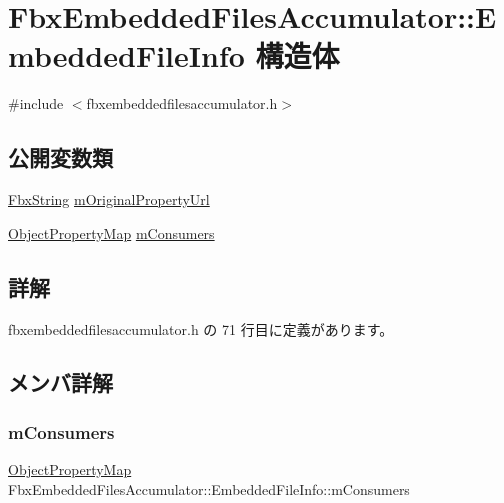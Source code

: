 \hypertarget{struct_fbx_embedded_files_accumulator_1_1_embedded_file_info}{}\section{Fbx\+Embedded\+Files\+Accumulator\+:\+:Embedded\+File\+Info 構造体}
\label{struct_fbx_embedded_files_accumulator_1_1_embedded_file_info}


{\ttfamily \#include $<$fbxembeddedfilesaccumulator.\+h$>$}

\subsection*{公開変数類}
\begin{DoxyCompactItemize}
\item 
\hyperlink{class_fbx_string}{Fbx\+String} \hyperlink{struct_fbx_embedded_files_accumulator_1_1_embedded_file_info_a3a7df7013bc1f2a90a3d1b9cad7b52e1}{m\+Original\+Property\+Url}
\item 
\hyperlink{class_fbx_embedded_files_accumulator_abc919e5ba3486530790dcd7ef90b8eed}{Object\+Property\+Map} \hyperlink{struct_fbx_embedded_files_accumulator_1_1_embedded_file_info_a04b3e7c42f3fe61536e8cc3a13ad682f}{m\+Consumers}
\end{DoxyCompactItemize}


\subsection{詳解}


 fbxembeddedfilesaccumulator.\+h の 71 行目に定義があります。



\subsection{メンバ詳解}
\mbox{\label{struct_fbx_embedded_files_accumulator_1_1_embedded_file_info_a04b3e7c42f3fe61536e8cc3a13ad682f}} 
\subsubsection{\texorpdfstring{m\+Consumers}{mConsumers}}
{\footnotesize\ttfamily \hyperlink{class_fbx_embedded_files_accumulator_abc919e5ba3486530790dcd7ef90b8eed}{Object\+Property\+Map} Fbx\+Embedded\+Files\+Accumulator\+::\+Embedded\+File\+Info\+::m\+Consumers}



